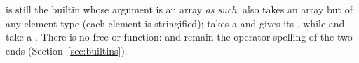 \noindent {} is still the builtin whose argument is an array
\emph{as such};  also takes an array but of any element
type (each element is stringified);  takes a  and gives
its \ic{[byte]}, while  and  take a
\ic{[byte]}. There is no free  or
 function: \ic{+=} and \ic{*=} remain the operator spelling
of the two ends (Section~\ref{sec:builtins}).
